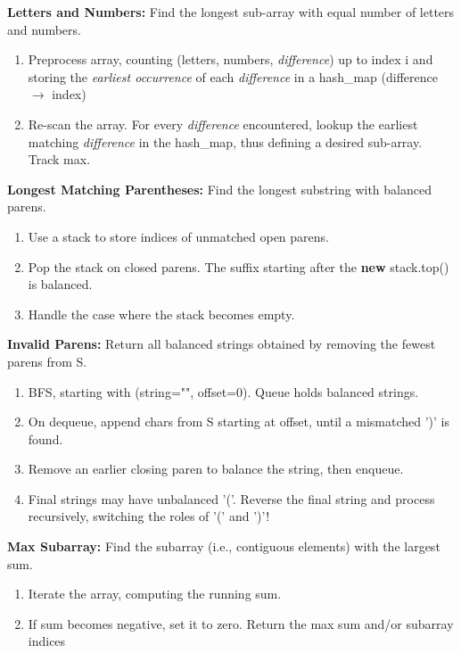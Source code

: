 \documentclass[12pt]{article}
\begin{document}
\vspace{5mm}
\noindent
\textbf{Letters and Numbers:}
Find the longest sub-array with equal number of letters and numbers.
\begin{enumerate}
\item Preprocess array, counting (letters, numbers, \emph{difference}) up to index i and storing
the \emph{earliest occurrence} of each \emph{difference} in a hash\_map (difference $\rightarrow$ index)
\item Re-scan the array. For every \emph{difference} encountered, lookup the earliest matching
\emph{difference} in the hash\_map, thus defining a desired sub-array. Track max.
\end{enumerate}


\vspace{5mm}
\noindent
\textbf{Longest Matching Parentheses:}
Find the longest substring with balanced parens.
\begin{enumerate}
\item Use a stack to store indices of unmatched open parens.
\item Pop the stack on closed parens. The suffix starting after the \textbf{new} stack.top() is balanced.
\item Handle the case where the stack becomes empty.
\end{enumerate}


\vspace{5mm}
\noindent
\textbf{Invalid Parens:}
Return all balanced strings obtained by removing the fewest parens from S.
\begin{enumerate}
\item BFS, starting with (string="", offset=0). Queue holds balanced strings.
\item On dequeue, append chars from S starting at offset, until a mismatched ')' is found.
\item Remove an earlier closing paren to balance the string, then enqueue.
\item Final strings may have unbalanced '('. Reverse the final string and process recursively,
switching the roles of '(' and ')'!
\end{enumerate}


\vspace{5mm}
\noindent
\textbf{Max Subarray:}
Find the subarray (i.e., contiguous elements) with the largest sum.
\begin{enumerate}
\item Iterate the array, computing the running sum.
\item If sum becomes negative, set it to zero. Return the max sum and/or subarray indices
\end{enumerate}
\end{document}
